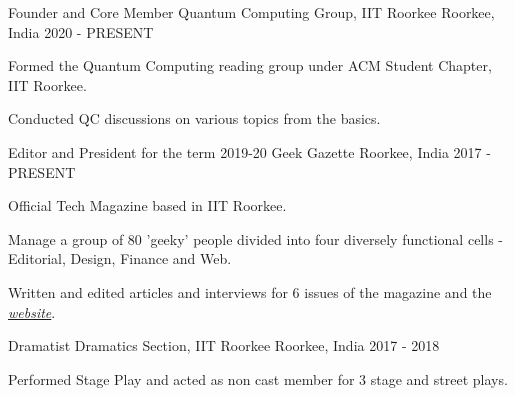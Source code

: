 

\begin{cventries}
  \cventry
    {Founder and Core Member} %
    {Quantum Computing Group, IIT Roorkee} %
    {Roorkee, India} %
    {2020 - PRESENT} %
    {
      \begin{cvitems} %
        \item {Formed the Quantum Computing reading group under ACM Student Chapter, IIT Roorkee.}
        \item {Conducted QC discussions on various topics from the basics.}
      \end{cvitems}
    }

  \cventry
    {Editor and President for the term 2019-20} %
    {Geek Gazette} %
    {Roorkee, India} %
    {2017 - PRESENT} %
    {
      \begin{cvitems} %
        \item {Official Tech Magazine based in IIT Roorkee.}
        \item {Manage a group of 80 'geeky' people divided into four diversely functional cells - Editorial, Design, Finance and Web.}
        \item {Written and edited articles and interviews for 6 issues of the magazine and the \emph{\href{https://geekgazette.iitr.ac.in}{website}}.}
      \end{cvitems}
    }

  \cventry
    {Dramatist} %
    {Dramatics Section, IIT Roorkee} %
    {Roorkee, India} %
    {2017 - 2018} %
    {
      \begin{cvitems} %
        \item {Performed Stage Play and acted as non cast member for 3 stage and street plays.}
      \end{cvitems}
    }
    

\end{cventries}
